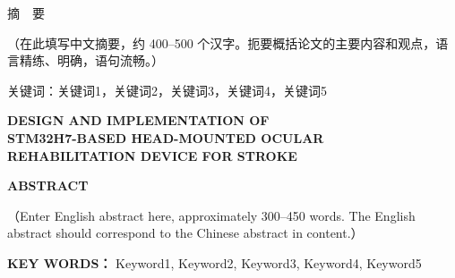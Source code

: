 
\begin{center}
{\heiti \husttitle}
\end{center}

\vskip 14pt

\begin{center}
{\heiti 摘\ \ 要}
\end{center}

\vskip 14pt

{\songti
（在此填写中文摘要，约 400--500 个汉字。扼要概括论文的主要内容和观点，语言精练、明确，语句流畅。）
}

\vskip 14pt

\noindent
{\heiti 关键词：}{\songti 关键词1，关键词2，关键词3，关键词4，关键词5}

\clearpage

\begin{center}
{\textbf{DESIGN AND IMPLEMENTATION OF \\[2pt]
STM32H7-BASED HEAD-MOUNTED OCULAR \\[2pt]
REHABILITATION DEVICE FOR STROKE}}
\end{center}

\vskip 28pt

\begin{center}
{\textbf{ABSTRACT}}
\end{center}

\vskip 28pt

{
（Enter English abstract here, approximately 300--450 words. The English abstract should correspond to the Chinese abstract in content.）
}

\vskip 28pt

\noindent
{\textbf{KEY WORDS：}}{ Keyword1, Keyword2, Keyword3, Keyword4, Keyword5}

\clearpage
